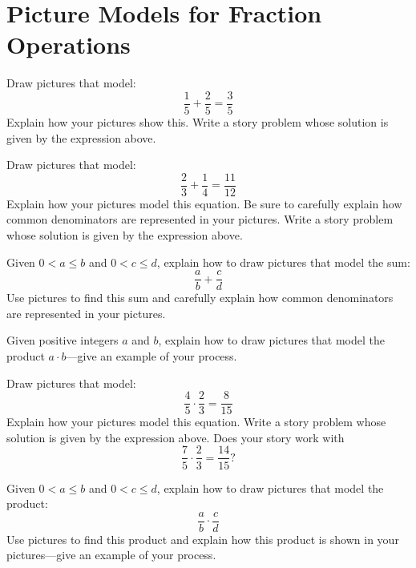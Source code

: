 \newpage
\section{Picture Models for Fraction Operations}\label{A:FO}

\begin{prob} 
Draw pictures that model:
\[
\frac{1}{5} + \frac{2}{5} = \frac{3}{5}
\]
Explain how your pictures show this. Write a story problem whose
solution is given by the expression above.
\end{prob}

\begin{prob} 
Draw pictures that model:
\[
\frac{2}{3} + \frac{1}{4} = \frac{11}{12}
\]
Explain how your pictures model this equation. Be sure to carefully
explain how common denominators are represented in your
pictures. Write a story problem whose solution is given by the
expression above.
\end{prob}

\begin{prob} 
Given $0<a\le b$ and $0<c\le d$, explain how to draw pictures
that model the sum:
\[
\frac{a}{b} + \frac{c}{d}
\]
Use pictures to find this sum and carefully explain how common
denominators are represented in your pictures.
\end{prob}

\begin{prob} 
Given positive integers $a$ and $b$, explain how to draw pictures that
model the product $a\cdot b$---give an example of your process.
\end{prob}

\begin{prob} 
Draw pictures that model:
\[
\frac{4}{5} \cdot \frac{2}{3} = \frac{8}{15}
\]
Explain how your pictures model this equation. Write a story problem
whose solution is given by the expression above. Does your story work with 
\[
\frac{7}{5} \cdot \frac{2}{3} = \frac{14}{15}?
\]
\end{prob}

\begin{prob} 
Given $0<a\le b$ and $0<c\le d$, explain how to draw pictures
that model the product:
\[
\frac{a}{b} \cdot \frac{c}{d}
\]
Use pictures to find this product and explain how this product is shown
in your pictures---give an example of your process.
\end{prob}
